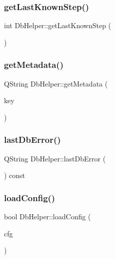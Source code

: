 \mbox{\label{class_db_helper_ae893a2d28952f0762b2c34648c39888c}} 
\subsubsection{\texorpdfstring{getLastKnownStep()}{getLastKnownStep()}}
{\footnotesize\ttfamily int Db\+Helper\+::get\+Last\+Known\+Step (\begin{DoxyParamCaption}{ }\end{DoxyParamCaption})}

\mbox{\label{class_db_helper_a84b8f8be38a78f95449c2c1b3f3f59f4}} 
\subsubsection{\texorpdfstring{getMetadata()}{getMetadata()}}
{\footnotesize\ttfamily Q\+String Db\+Helper\+::get\+Metadata (\begin{DoxyParamCaption}\item[{Q\+String}]{key }\end{DoxyParamCaption})}

\mbox{\label{class_db_helper_a969d9830aa0bf62dfc2740efe280311a}} 
\subsubsection{\texorpdfstring{lastDbError()}{lastDbError()}}
{\footnotesize\ttfamily Q\+String Db\+Helper\+::last\+Db\+Error (\begin{DoxyParamCaption}{ }\end{DoxyParamCaption}) const}

\mbox{\label{class_db_helper_ad7def03594fbc3514f8cf118ee15d8a5}} 
\subsubsection{\texorpdfstring{loadConfig()}{loadConfig()}}
{\footnotesize\ttfamily bool Db\+Helper\+::load\+Config (\begin{DoxyParamCaption}\item[{\mbox{\hyperlink{class_config}{Config}} \&}]{cfg }\end{DoxyParamCaption})}

